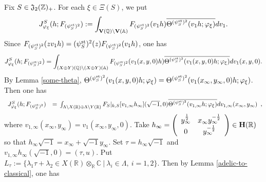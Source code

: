 \documentclass[11pt]{amsart}
\numberwithin{equation}{section}
\theoremstyle{definition}
\begin{document}
Fix $S\in \frak J_2({\mathbb{Z}})_{+}$. 
For each $\xi \in \Xi(S)$, we put 
$$J^S_{\varphi_\xi}(h;F_{(\psi^{{\rm st}}_S)^2}):=\int_{\bold V({\mathbb{Q}}){\backslash} \bold V({\mathbb{A}})}F_{(\psi^{{\rm st}}_S)^2}(v_1h)
\overline{\Theta^{(\psi^{{\rm st}}_S)^2}(v_1h;\varphi_\xi)}dv_1.$$
Since $F_{(\psi^{{\rm st}}_S)^2}(zv_1h)=(\psi^{{\rm st}}_S)^2(z)F_{(\psi^{{\rm st}}_S)^2}(v_1h)$, one has 
$$J^S_{\varphi_\xi}(h;F_{(\psi^{{\rm st}}_S)^2})=
\int_{(X\oplus Y)({\mathbb{Q}}){\backslash} (X\oplus Y)({\mathbb{A}})}F_{(\psi^{{\rm st}}_S)^2}
(v_1(x,y,0)h)\overline{\Theta^{(\psi^{{\rm st}}_S)^2}(v_1(x,y,0)h;\varphi_\xi)}dv_1(x,y,0).
$$
By Lemma \ref{some-theta}, $\Theta^{(\psi^{{\rm st}}_S)^2}(v_1(x,y,0)h;\varphi_\xi)=
\Theta^{(\psi^{{\rm st}}_S)^2}(v_1(x_\infty,y_\infty,0)h;\varphi_\xi)$.
Then one has 
$$
\begin{array}{rl}
J^S_{\varphi_\xi}(h;F_{(\psi^{{\rm st}}_S)^2})&=
{\displaystyle}\int_{\Lambda{\backslash} X({\mathbb{R}})\oplus \Lambda{\backslash} Y({\mathbb{R}})}
F_S|_{k,S}[v_{1,\infty}h_\infty](\sqrt{-1},0)\overline{\Theta^{(\psi^{{\rm st}}_S)^2}(v_{1,\infty}h;\varphi_\xi)}dv_{1,\infty}
(x_\infty,y_\infty)
\end{array},
$$
where $v_{1,\infty}(x_\infty,y_\infty)=v_1(x_\infty,y_\infty,0)$. Take 
$h_\infty=\left(
\begin{array}{cc}
y^{\frac{1}{2}}_\infty & x_\infty y^{-\frac{1}{2}}_\infty\\
0 & y^{-\frac{1}{2}}_\infty
\end{array}\right)\in \bold H({\mathbb{R}})$ so that $h_\infty \sqrt{-1}=x_\infty+\sqrt{-1} y_\infty$. Set 
$\tau=h_\infty \sqrt{-1}$ and $v_{1,\infty}h_\infty(\sqrt{-1},0)=(\tau,u)$. Put   
$L_\tau:=\{\lambda_1\tau+\lambda_2\in X({\mathbb{R}})\otimes_{\mathbb{R}}{\mathbb{C}}\ |\ \lambda_i\in \Lambda,\ i=1,2 \}$. 
Then by Lemma \ref{adelic-to-classical}, 
one has 
\end{document}
